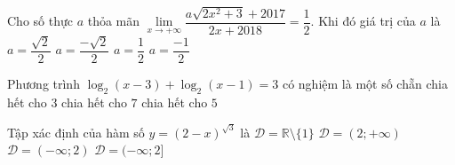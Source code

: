 \begin{ex}%
	Cho số thực $a$ thỏa mãn $\lim\limits_{x\to +\infty} \dfrac{a\sqrt{2x^2+3}+2017}{2x+2018}=\dfrac{1}{2}$. Khi đó giá trị của $a$ là
	\choice
	{\True $a=\dfrac{\sqrt{2}}{2}$}
	{$a=\dfrac{-\sqrt{2}}{2}$}
	{$a=\dfrac{1}{2}$}
	{$a=\dfrac{-1}{2}$}
\end{ex}

\begin{ex}%
	Phương trình $\log_{2}(x-3)+\log_{2}(x-1)=3$ có nghiệm là một số
	\choice
	{chẵn}
	{chia hết cho $3$}
	{chia hết cho $7$}
	{\True chia hết cho $5$}
\end{ex}

\begin{ex}%
	Tập xác định của hàm số $y=(2-x)^{\sqrt{3}}$ là
	\choice
	{$\mathscr{D}=\mathbb{R}\setminus \{1\}$}
	{$\mathscr{D}=(2;+\infty)$}
	{\True $\mathscr{D}=(-\infty;2)$}
	{$\mathscr{D}=(-\infty;2]$}
\end{ex}

